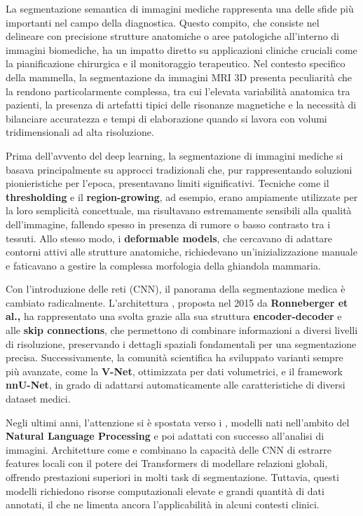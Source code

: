 

La segmentazione semantica di immagini mediche rappresenta una delle sfide più importanti nel campo della diagnostica. Questo compito, che consiste nel delineare con precisione strutture anatomiche o aree patologiche all’interno di immagini biomediche, ha un impatto diretto su applicazioni cliniche cruciali come la pianificazione chirurgica e il monitoraggio terapeutico. Nel contesto specifico della mammella, la segmentazione da immagini MRI 3D presenta peculiarità che la rendono particolarmente complessa, tra cui l’elevata variabilità anatomica tra pazienti, la presenza di artefatti tipici delle risonanze magnetiche e la necessità di bilanciare accuratezza e tempi di elaborazione quando si lavora con volumi tridimensionali ad alta risoluzione.


Prima dell’avvento del deep learning, la segmentazione di immagini mediche si basava principalmente su approcci tradizionali che, pur rappresentando soluzioni pionieristiche per l’epoca, presentavano limiti significativi. Tecniche come il \textbf{thresholding} e il \textbf{region-growing}, ad esempio, erano ampiamente utilizzate per la loro semplicità concettuale, ma risultavano estremamente sensibili alla qualità dell’immagine, fallendo spesso in presenza di rumore o basso contrasto tra i tessuti. Allo stesso modo, i \textbf{deformable models}, che cercavano di adattare contorni attivi alle strutture anatomiche, richiedevano un’inizializzazione manuale e faticavano a gestire la complessa morfologia della ghiandola mammaria.

Con l’introduzione delle reti  (CNN), il panorama della segmentazione medica è cambiato radicalmente. L’architettura , proposta nel 2015 da \textbf{Ronneberger et al.,} ha rappresentato una svolta grazie alla sua struttura \textbf{encoder-decoder} e alle \textbf{skip connections}, che permettono di combinare informazioni a diversi livelli di risoluzione, preservando i dettagli spaziali fondamentali per una segmentazione precisa. Successivamente, la comunità scientifica ha sviluppato varianti sempre più avanzate, come la \textbf{V-Net}, ottimizzata per dati volumetrici, e il framework \textbf{nnU-Net}, in grado di adattarsi automaticamente alle caratteristiche di diversi dataset medici.

Negli ultimi anni, l’attenzione si è spostata verso i , modelli nati nell’ambito del \textbf{Natural Language Processing} e poi adattati con successo all’analisi di immagini. Architetture come  e  combinano la capacità delle CNN di estrarre features locali con il potere dei Transformers di modellare relazioni globali, offrendo prestazioni superiori in molti task di segmentazione. Tuttavia, questi modelli richiedono risorse computazionali elevate e grandi quantità di dati annotati, il che ne limenta ancora l’applicabilità in alcuni contesti clinici.


